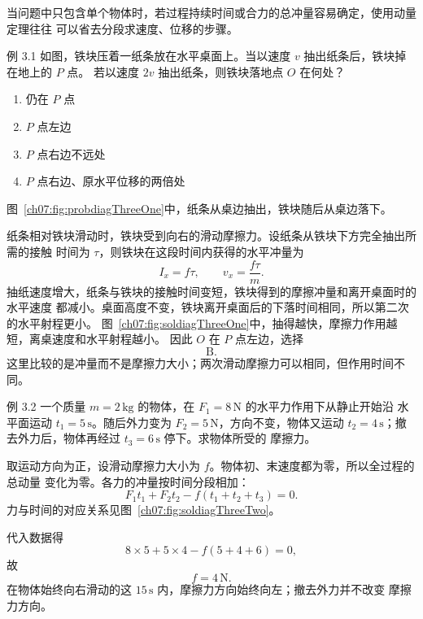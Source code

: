 当问题中只包含单个物体时，若过程持续时间或合力的总冲量容易确定，使用动量定理往往
可以省去分段求速度、位移的步骤。



\begin{origexamplebox}{例 3.1}
如图，铁块压着一纸条放在水平桌面上。当以速度 $v$ 抽出纸条后，铁块掉在地上的 $P$ 点。
若以速度 $2v$ 抽出纸条，则铁块落地点 $O$ 在何处？
\begin{enumerate}[label=\Alph*.,leftmargin=2.2em]
 \item 仍在 $P$ 点
 \item $P$ 点左边
 \item $P$ 点右边不远处
 \item $P$ 点右边、原水平位移的两倍处
\end{enumerate}
图~\ref{ch07:fig:probdiagThreeOne}中，纸条从桌边抽出，铁块随后从桌边落下。
\probdiagThreeOne
\end{origexamplebox}

\begin{xesolution}
纸条相对铁块滑动时，铁块受到向右的滑动摩擦力。设纸条从铁块下方完全抽出所需的接触
时间为 $\tau$，则铁块在这段时间内获得的水平冲量为
\[
 I_x=f\tau,
 \qquad
 v_x=\frac{f\tau}{m}.
\]
抽纸速度增大，纸条与铁块的接触时间变短，铁块得到的摩擦冲量和离开桌面时的水平速度
都减小。桌面高度不变，铁块离开桌面后的下落时间相同，所以第二次的水平射程更小。
图~\ref{ch07:fig:soldiagThreeOne}中，抽得越快，摩擦力作用越短，离桌速度和水平射程越小。
\soldiagThreeOne
因此 $O$ 在 $P$ 点左边，选择
\[
 \boxed{\text{B}}.
\]
这里比较的是冲量而不是摩擦力大小；两次滑动摩擦力可以相同，但作用时间不同。
\end{xesolution}

\begin{origexamplebox}{例 3.2}
一个质量 $m=2\,\mathrm{kg}$ 的物体，在 $F_1=8\,\mathrm N$ 的水平力作用下从静止开始沿
水平面运动 $t_1=5\,\mathrm s$。随后外力变为 $F_2=5\,\mathrm N$，方向不变，物体又运动
$t_2=4\,\mathrm s$；撤去外力后，物体再经过 $t_3=6\,\mathrm s$ 停下。求物体所受的
摩擦力。
\end{origexamplebox}

\begin{xesolution}
取运动方向为正，设滑动摩擦力大小为 $f$。物体初、末速度都为零，所以全过程的总动量
变化为零。各力的冲量按时间分段相加：
\[
 F_1t_1+F_2t_2-f(t_1+t_2+t_3)=0.
\]
力与时间的对应关系见图~\ref{ch07:fig:soldiagThreeTwo}。

\soldiagThreeTwo
代入数据得
\[
 8\times5+5\times4-f(5+4+6)=0,
\]
故
\[
 \boxed{f=4\,\mathrm N}.
\]
在物体始终向右滑动的这 $15\,\mathrm s$ 内，摩擦力方向始终向左；撤去外力并不改变
摩擦力方向。
\end{xesolution}

